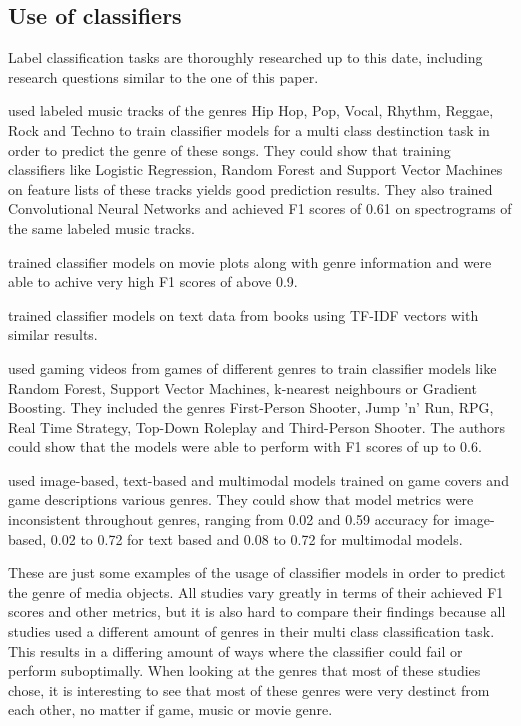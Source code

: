 \documentclass[11pt, a4paper]{article}
\begin{document}
\subsection{Use of classifiers}\label{subsec:use-of-classifiers}
Label classification tasks are thoroughly researched up to this date, including research questions similar to the one
of this paper.

\cite{Bahuleyan2018} used labeled music tracks of the genres Hip Hop, Pop, Vocal, Rhythm, Reggae, Rock and Techno to
train classifier models for a multi class destinction task in order to predict the genre of these songs.
They could show that training classifiers like Logistic Regression, Random Forest and Support Vector
Machines on feature lists of these tracks yields good prediction results.
They also trained Convolutional Neural Networks and achieved F1 scores of 0.61 on spectrograms of the same labeled music
tracks.

\cite{Kumar2022} trained classifier models on movie plots along with genre information and were able to achive very
high F1 scores of above 0.9.

\cite{Gupta2019} trained classifier models on text data from books using TF-IDF vectors with similar results.

\cite{Goering2020} used gaming videos from games of different genres to train classifier models like Random Forest,
Support Vector Machines, k-nearest neighbours or Gradient Boosting.
They included the genres First-Person Shooter, Jump 'n' Run, RPG, Real Time Strategy, Top-Down Roleplay and Third-Person
Shooter.
The authors could show that the models were able to perform with F1 scores of up to 0.6.

\cite{Jiang2023} used image-based, text-based and multimodal models trained on game covers and game descriptions
various genres.
They could show that model metrics were inconsistent throughout genres, ranging from 0.02 and 0.59 accuracy for
image-based, 0.02 to 0.72 for text based and 0.08 to 0.72 for multimodal models.

These are just some examples of the usage of classifier models in order to predict the genre of media objects.
All studies vary greatly in terms of their achieved F1 scores and other metrics, but it is also hard to compare their
findings because all studies used a different amount of genres in their multi class classification task.
This results in a differing amount of ways where the classifier could fail or perform suboptimally.
When looking at the genres that most of these studies chose, it is interesting to see that most of these genres
were very destinct from each other, no matter if game, music or movie genre.
\end{document}
